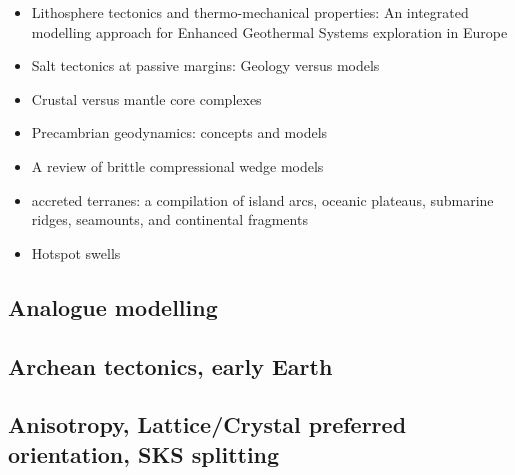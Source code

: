\begin{itemize}
\item Lithosphere tectonics and thermo-mechanical properties: An integrated modelling
approach for Enhanced Geothermal Systems exploration in Europe \cite{clvz10}
\item Salt tectonics at passive margins: Geology versus models \cite{brfo11}
\item Crustal versus mantle core complexes \cite{brst18}
\item Precambrian geodynamics: concepts and models \cite{gery14}
\item A review of brittle compressional wedge models \cite{buit12}
\item accreted terranes: a compilation of island arcs, oceanic
      plateaus, submarine ridges, seamounts, and continental fragments \cite{tebu14}
\item Hotspot swells \cite{kiad14}
\end{itemize}

\subsection*{Analogue modelling}

\noindent
\cite{nabr93}
\cite{sche00}
\cite{haki01}
\cite{jujb05}\cite{sche05}
\cite{scbb06}
\cite{clbz08}\cite{fufh08}
\cite{pina09}
\cite{luws13}
\cite{casw15}\cite{rods15}\cite{kiff15}
\cite{casw17}
\cite{pirf18}
\cite{mocb19}\cite{sccs19}\cite{muwm19}

\subsection*{Archean tectonics, early Earth}

\noindent
\cite{canc19}\cite{gery19}

\subsection*{Anisotropy, Lattice/Crystal preferred orientation, SKS splitting}

\noindent
\cite{mudm02}
\cite{mumc03}
\cite{mumc04}
\cite{besb06}
\cite{faca13}
\cite{facc14}

